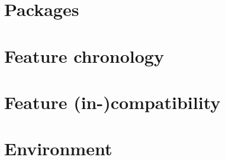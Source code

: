 \documentclass[letterpaper,hyper]{HDF}
\begin{document}

\appendix

\chapter{Packages}\label{app:conventions}


\chapter{Feature chronology}\label{app:chronology}


\chapter{Feature (in-)compatibility}\label{app:feat-compat}


\chapter{Environment}\label{app:environment}


%

\printbibliography
\end{document}
